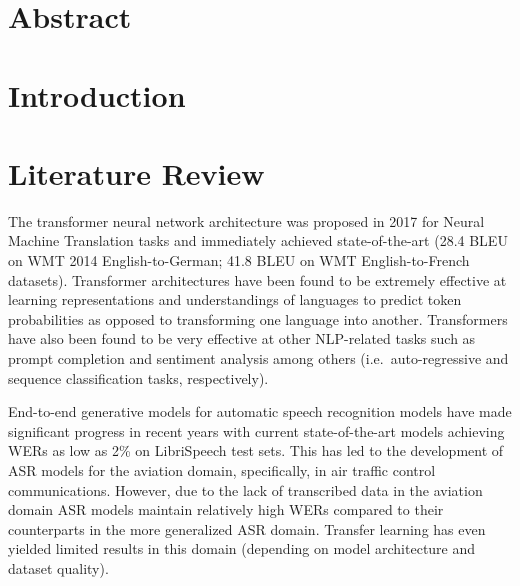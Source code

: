 \documentclass[12pt]{article}
\begin{document}
\section{Abstract}\label{sec:abstract}

\section{Introduction}\label{sec:introduction}

\section{Literature Review}\label{sec:lit_review}
The transformer neural network architecture was proposed in 2017 for Neural Machine Translation tasks and immediately achieved
state-of-the-art (28.4 BLEU on WMT 2014 English-to-German; 41.8 BLEU on WMT English-to-French datasets)\cite{vaswani_attention_2017}. Transformer
architectures have been found to be extremely effective at learning representations and understandings of languages to predict token probabilities as
opposed to transforming one language into another\cite{devlin_bert_2019,liu_roberta_2019}. Transformers have also been found to be very effective at
other NLP-related tasks such as prompt completion and sentiment analysis among others (i.e.~auto-regressive and sequence classification tasks,
respectively)\cite{lewis_bart_2019,radford_improving_2018}.


End-to-end generative models for automatic speech recognition models have made significant progress in recent years with current state-of-the-art
models achieving WERs as low as 2\% on LibriSpeech test sets\cite{han_contextnet_2020,kriman_quartznet_2020,baevski_wav2vec_2020,li_jasper_2019}.
This has led to the development of ASR models for the aviation domain, specifically, in air traffic control communications\cite{badrinath_automatic_2022,smidl_air_2019,zuluaga-gomez_automatic_2020,srinivasamurthy_semi-supervised_2017}. However, due to the lack of
transcribed data in the aviation domain\cite{zuluaga-gomez_automatic_2020,srinivasamurthy_semi-supervised_2017,badrinath_automatic_2022,smidl_air_2019}
ASR models maintain relatively high WERs compared to their counterparts in the more generalized ASR domain\cite{zuluaga-gomez_automatic_2020,badrinath_automatic_2022}. Transfer learning has even yielded limited results in this domain (depending on model
architecture and dataset quality)\cite{badrinath_automatic_2022,zuluaga-gomez_automatic_2020}.
\end{document}
